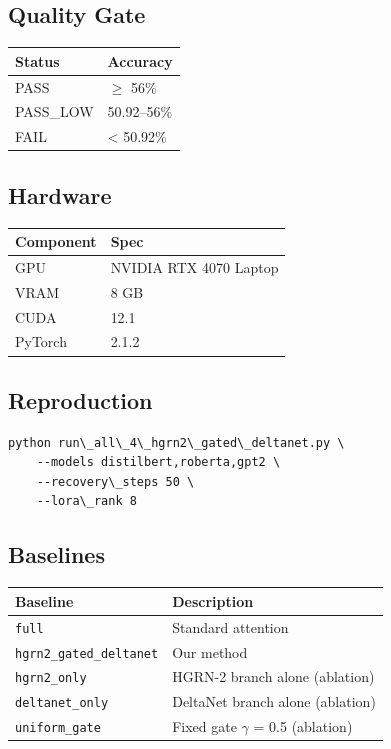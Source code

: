 \subsection{Quality Gate}

\begin{table}[H]
\centering
\small
\begin{tabular}{ll}
\toprule
\textbf{Status} & \textbf{Accuracy} \\
\midrule
PASS & $\ge$ 56\% \\
PASS\_LOW & 50.92--56\% \\
FAIL & \textless{} 50.92\% \\
\bottomrule
\end{tabular}
\end{table}

\subsection{Hardware}

\begin{table}[H]
\centering
\small
\begin{tabular}{ll}
\toprule
\textbf{Component} & \textbf{Spec} \\
\midrule
GPU & NVIDIA RTX 4070 Laptop \\
VRAM & 8 GB \\
CUDA & 12.1 \\
PyTorch & 2.1.2 \\
\bottomrule
\end{tabular}
\end{table}

\subsection{Reproduction}

\begin{lstlisting}
python run\_all\_4\_hgrn2\_gated\_deltanet.py \
    --models distilbert,roberta,gpt2 \
    --recovery\_steps 50 \
    --lora\_rank 8
\end{lstlisting}

\subsection{Baselines}

\begin{table}[H]
\centering
\small
\begin{tabular}{ll}
\toprule
\textbf{Baseline} & \textbf{Description} \\
\midrule
\texttt{full} & Standard attention \\
\texttt{hgrn2\_gated\_deltanet} & Our method \\
\texttt{hgrn2\_only} & HGRN-2 branch alone (ablation) \\
\texttt{deltanet\_only} & DeltaNet branch alone (ablation) \\
\texttt{uniform\_gate} & Fixed gate $\gamma$ = 0.5 (ablation) \\
\bottomrule
\end{tabular}
\end{table}

